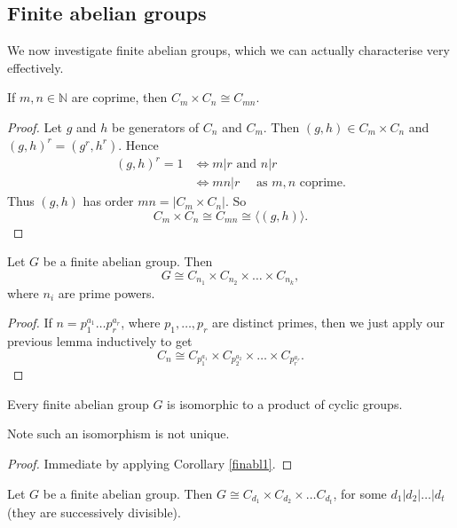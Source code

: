 \documentclass[a4paper]{scrartcl}
\begin{document}
\subsection{Finite abelian groups}
We now investigate finite abelian groups, which we can actually characterise very effectively.
\begin{lemma}
      If $m,n \in \mathbb{N}$ are coprime, then $C_m \times C_n \cong C_{mn}$.
\end{lemma}
\begin{proof}
      Let $g$ and $h$ be generators of $C_n$ and $C_m$. Then $(g,h)\in C_m \times C_n$ and $(g,h)^{r}=(g^{r}, h^{r})$. Hence 
      \begin{align*}
           (g,h)^{r}=1 &\iff m|r \text{ and } n|r\\
           & \iff mn|r \quad \text{ as } m,n \text{ coprime}.
      \end{align*}
      Thus $(g,h)$ has order $mn =|C_m \times C_n|$. So \[
      C_m \times C_n \cong C_{mn} \cong \langle (g,h) \rangle 
      .\]
\end{proof}
\begin{corollary}\label{finabl1}
     Let $G$ be a finite abelian group. Then \[
     G \cong C_{n_1 } \times C_{n_2 }\times \ldots \times C_{n_k}
     ,\] where $n_{i}$ are prime powers. 
\end{corollary}
\begin{proof}
      If $n=p_1^{a_1 }\ldots p_r ^{a_r}$, where $p_1 ,\ldots , p_r$ are distinct primes, then we just apply our previous lemma inductively to get \[
      C_{n}\cong C_{p_1 ^{a_1 }}\times C_{p_2 ^{a_2 }}\times \ldots \times C_{p_r ^{a_r }}
      .\] 
\end{proof}
\begin{theorem}\label{finabl2}
     Every finite abelian group $G$ is isomorphic to a product of cyclic groups.

     Note such an isomorphism is not unique.
\end{theorem}
\begin{proof}
      Immediate by applying Corollary \ref{finabl1}.
\end{proof}
\begin{theorem}\label{finabl3}
      Let $G$ be a finite abelian group. Then $G \cong C_{d_1 }\times C_{d_2 }\times \ldots C_{d_t}$, for some $d_1 | d_2 | \ldots | d_t$ (they are successively divisible).
\end{theorem}
\begin{remark}
      
\end{remark}
\end{document}
